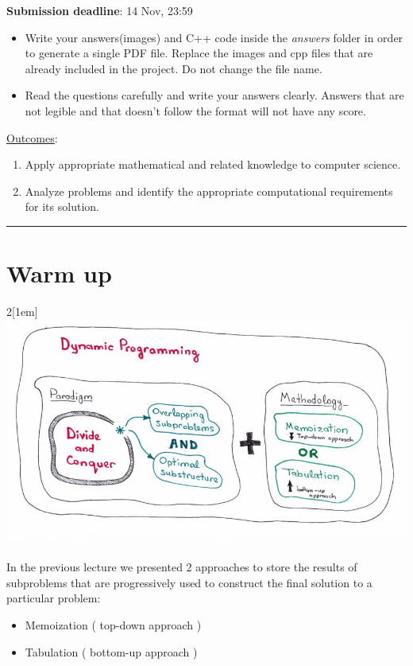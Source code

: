 
\usepackage{pdfpages}


\textbf{Submission deadline}: 14 Nov, 23:59\\ 

\begin{itemize}
    \item Write your answers(images) and C++ code inside the \emph{answers} folder in order to generate a single PDF file. Replace the images and cpp files that are already included in the project. Do not change the file name.
    \item Read the questions carefully and write your answers clearly. Answers that are not legible and that doesn't follow the format will not have any score. 
\end{itemize}

\underline{Outcomes}:

\begin{enumerate}[label=\alph*.]
    \item Apply appropriate mathematical and related knowledge to computer science.
    \item Analyze problems and identify the appropriate computational requirements for its solution.
\end{enumerate}
\noindent\rule{\textwidth}{0.01pt}
\vspace{3mm}

\section{Warm up}

\begin{multicols}{2}[\columnsep1em] 
    \includegraphics[width=\linewidth]{img/dynamic}
    \columnbreak

    In the previous lecture we presented 2 approaches to store the results of subproblems that are progressively used to construct the final solution to a particular problem:
    \begin{itemize}
        \item Memoization ( top-down approach )
        \item Tabulation ( bottom-up approach )
    \end{itemize}
\end{multicols}

